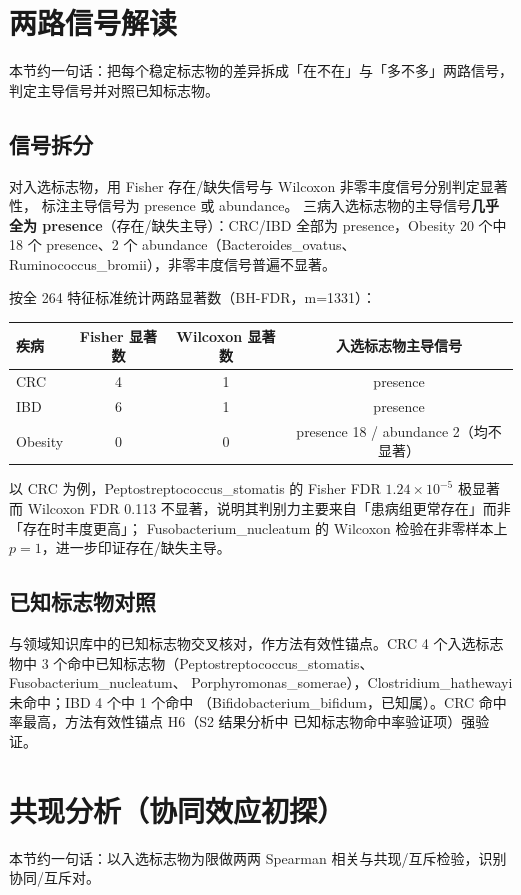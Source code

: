 \documentclass{internal-report}
\begin{document}
\section{两路信号解读}
本节约一句话：把每个稳定标志物的差异拆成「在不在」与「多不多」两路信号，判定主导信号并对照已知标志物。

\subsection{信号拆分}
对入选标志物，用 Fisher 存在/缺失信号与 Wilcoxon 非零丰度信号分别判定显著性，
标注主导信号为 presence 或 abundance。
三病入选标志物的主导信号\textbf{几乎全为 presence}（存在/缺失主导）：CRC/IBD 全部为
presence，Obesity 20 个中 18 个 presence、2 个 abundance（Bacteroides\_ovatus、
Ruminococcus\_bromii），非零丰度信号普遍不显著。

按全 264 特征标准统计两路显著数（BH-FDR，m=1331）：
\begin{center}
\footnotesize
\begin{tabular}{l c c c}
\toprule
疾病 & Fisher 显著数 & Wilcoxon 显著数 & 入选标志物主导信号 \\
\midrule
CRC & 4 & 1 & presence \\
IBD & 6 & 1 & presence \\
Obesity & 0 & 0 & presence 18 / abundance 2（均不显著） \\
\bottomrule
\end{tabular}
\end{center}
以 CRC 为例，Peptostreptococcus\_stomatis 的 Fisher FDR $1.24\times10^{-5}$ 极显著而
Wilcoxon FDR 0.113 不显著，说明其判别力主要来自「患病组更常存在」而非「存在时丰度更高」；
Fusobacterium\_nucleatum 的 Wilcoxon 检验在非零样本上 $p=1$，进一步印证存在/缺失主导。

\subsection{已知标志物对照}
与领域知识库中的已知标志物交叉核对，作方法有效性锚点。CRC 4 个入选标志物中
3 个命中已知标志物（Peptostreptococcus\_stomatis、Fusobacterium\_nucleatum、
Porphyromonas\_somerae），Clostridium\_hathewayi 未命中；IBD 4 个中 1 个命中
（Bifidobacterium\_bifidum，已知属）。CRC 命中率最高，方法有效性锚点 H6（S2 结果分析中
已知标志物命中率验证项）强验证。

\section{共现分析（协同效应初探）}
本节约一句话：以入选标志物为限做两两 Spearman 相关与共现/互斥检验，识别协同/互斥对。
\end{document}
